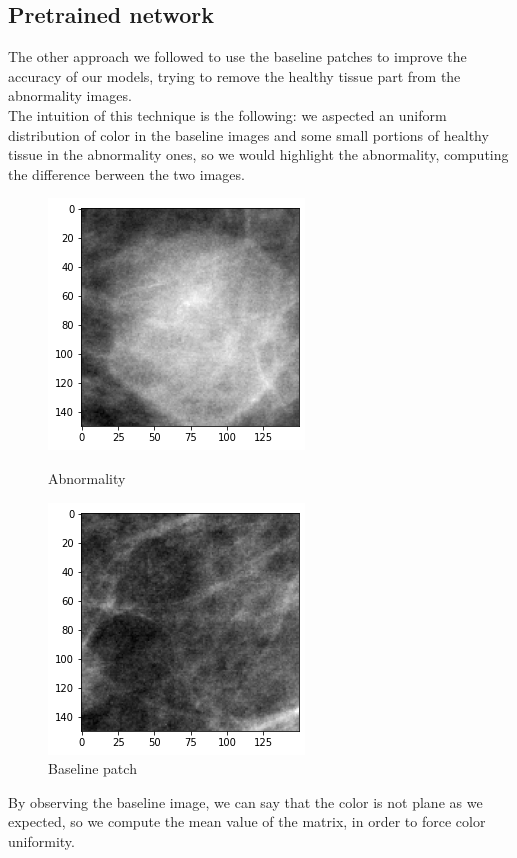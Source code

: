 \documentclass{article}
\begin{document}
\subsection{Pretrained network}
The other approach we followed to use the baseline patches to improve the accuracy of our models, trying to remove the healthy tissue part from the abnormality images.\\
The intuition of this technique is the following: we aspected an uniform distribution of color in the baseline images and some small portions of healthy tissue in the abnormality ones, so we would highlight the abnormality, computing the difference berween the two images.
\begin{figure}[H]
    \centering
    \begin{minipage}{0.45\textwidth}
        \centering
        \includegraphics[scale=0.56]{./img/abnormality.png}
	\caption{Abnormality}
    \end{minipage}\hfill
    \begin{minipage}{0.45\textwidth}
        \centering
        \includegraphics[scale=0.56]{./img/baseline.png}
\caption{Baseline patch}
    \end{minipage}
\end{figure}\vspace{1mm}By observing the baseline image, we can say that the color is not plane as we expected, so we compute the mean value of the matrix, in order to force color uniformity. \\
\end{document}
